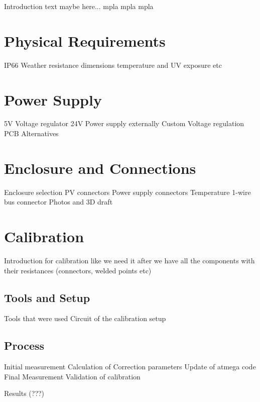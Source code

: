 Introduction text maybe here...
mpla mpla mpla

\section{Physical Requirements}
IP66
Weather resistance
dimensions
temperature and UV exposure
etc

\section{Power Supply}
5V Voltage regulator
24V Power supply externally
Custom Voltage regulation PCB
Alternatives

\section{Enclosure and Connections}
Enclosure selection
PV connectors
Power supply connectors
Temperature 1-wire bus connector
Photos and 3D draft

\section{Calibration}
Introduction for calibration like we need it after we have all the components with their resistances (connectors, welded points etc)

\subsection{Tools and Setup}
Tools that were used
Circuit of the calibration setup

\subsection{Process}
Initial measurement
Calculation of Correction parameters
Update of atmega code
Final Measurement
Validation of calibration

Results (???)